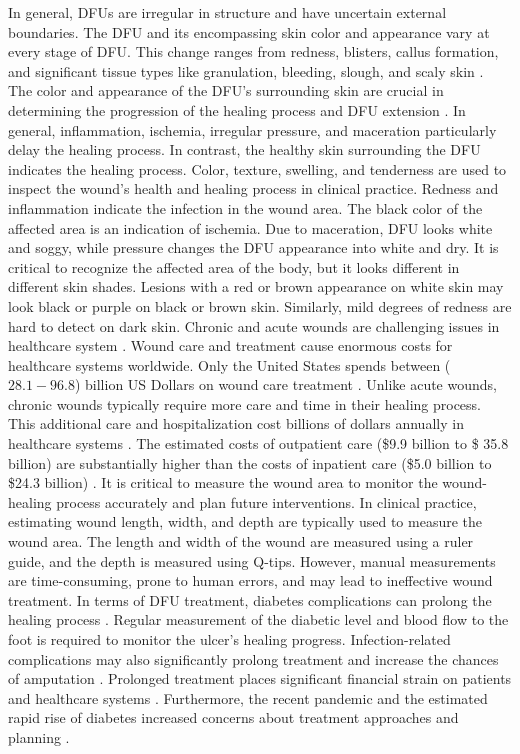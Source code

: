 \documentclass[review]{elsarticle}
\begin{document}
\newline\indent In general, DFUs are irregular in structure and have uncertain external boundaries. The DFU and its encompassing skin color and appearance vary at every stage of DFU. This change ranges from redness, blisters, callus formation, and significant tissue types like granulation, bleeding, slough, and scaly skin \cite{lipsky2004diagnosis}. The color and appearance of the DFU's surrounding skin are crucial in determining the progression of the healing process and DFU extension \cite{steed1996effect,rajbhandari1999digital}. In general, inflammation, ischemia, irregular pressure, and maceration particularly delay the healing process. In contrast, the healthy skin surrounding the DFU indicates the healing process. Color, texture, swelling, and tenderness are used to inspect the wound's health and healing process in clinical practice. Redness and inflammation indicate the infection in the wound area. The black color of the affected area is an indication of ischemia. Due to maceration, DFU looks white and soggy, while pressure changes the DFU appearance into white and dry. It is critical to recognize the affected area of the body, but it looks different in different skin shades. Lesions with a red or brown appearance on white skin may look black or purple on black or brown skin. Similarly, mild degrees of redness are hard to detect on dark skin.
\newline\indent Chronic and acute wounds are challenging issues in healthcare system \cite{frykbergrobert2015challenges}. Wound care and treatment cause enormous costs for healthcare systems worldwide. Only the United States spends between ($28.1- 96.8$) billion US Dollars on wound care treatment \cite{sen2019human}. Unlike acute wounds, chronic wounds typically require more care and time in their healing process. This additional care and hospitalization cost billions of dollars annually in healthcare systems \cite{branski2009review}. The estimated costs of outpatient care (\$9.9 billion to \$ 35.8 billion) are substantially higher than the costs of inpatient care (\$5.0 billion to \$24.3 billion) \cite{nussbaum2018economic}. It is critical to measure the wound area to monitor the wound-healing process accurately and plan future interventions. In clinical practice, estimating wound length, width, and depth are typically used to measure the wound area. The length and width of the wound are measured using a ruler guide, and the depth is measured using Q-tips. However, manual measurements are time-consuming, prone to human errors, and may lead to ineffective wound treatment. In terms of DFU treatment, diabetes complications can prolong the healing process \cite{davis2018dysfunctional}. Regular measurement of the diabetic level and blood flow to the foot is required to monitor the ulcer's healing progress. Infection-related complications may also significantly prolong treatment and increase the chances of amputation \cite{chang2021strategy,glover20213d}. Prolonged treatment places significant financial strain on patients and healthcare systems \cite{edmonds2021current,lo2021clinical}. Furthermore, the recent pandemic \cite{pranata2021diabetes} and the estimated rapid rise of diabetes increased concerns about treatment approaches and planning \cite{sun2022idf}.
\end{document}
